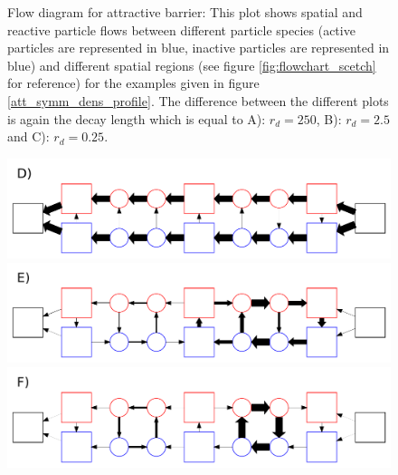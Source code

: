 \begin{minipage}[t]{.372 \textwidth}
    \vspace{.5 cm}
    \begin{figure}[H]
        \caption{Flow diagram for attractive barrier: This plot shows spatial and reactive particle flows between different particle species (active particles are represented in blue, inactive particles are represented in blue) and different spatial regions (see figure \ref{fig:flowchart_scetch} for reference) for the examples given in figure \ref{att_symm_dens_profile}. The difference between the different plots is again the decay length which is equal to \newline A): $r_d=250$, B): $r_d=2.5$ and \newline C): $r_d = 0.25$.
    \label{fig:flow_attractive}}
    \end{figure}
\end{minipage}\hspace{0.02 \textwidth}\begin{minipage}[t]{.608 \textwidth}
    \begin{figure}[H]
        \includegraphics[width = 1 \textwidth]{plots/att_flowchart0.pdf}
        \includegraphics[width = 1 \textwidth]{plots/att_flowchart1.pdf}
        \includegraphics[width = 1 \textwidth]{plots/att_flowchart2.pdf}
    \end{figure}
\end{minipage}
